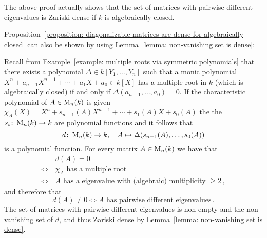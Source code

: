 \begin{remark}
  The above proof actually shows that the set of matrices with pairwise different eigenvalues is Zariski dense if $k$ is algebraically closed.
\end{remark}


\begin{remark}
  Proposition~\ref{proposition: diagonalizable matrices are dense for algebraically closed} can also be shown by using Lemma~\ref{lemma: non-vanishing set is dense}:
  
  Recall from Example~\ref{example: multiple roots via symmetric polynomials} that there exists a polynomial $\Delta \in k[Y_1, \dotsc, Y_n]$ such that a monic polynomial $X^n + a_{n-1} X^{n-1} + \dotsb + a_1 X + a_0 \in k[X]$ has a multiple root in $k$ (which is algebraically closed) if and only if $\Delta(a_{n-1}, \dotsc, a_0) = 0$.
  If the characteristic polynomial of $A \in \operatorname{M}_n(k)$ is given $\chi_A(X) = X^n + s_{n-1}(A) X^{n-1} + \dotsb + s_1(A) X + s_0(A)$ the the $s_i \colon \operatorname{M}_n(k) \to k$ are polynomial functions and it follows that
  \[
            d
    \colon  \operatorname{M}_n(k)
    \to     k,
    \quad   A
    \mapsto \Delta(s_{n-1}(A), \dotsc, s_0(A))
  \]
  is a polynomial function.
  For every matrix $A \in \operatorname{M}_n(k)$ we have that
  \begin{align*}
        &\, d(A) = 0  \\
    \iff&\, \text{$\chi_A$ has a multiple root} \\
    \iff&\, \text{$A$ has a eigenvalue with (algebraic) multiplicity $\geq 2$} \,,
  \end{align*}
  and therefore that
  \[
          d(A) \neq 0
    \iff  \text{$A$ has pairwise different eigenvalues} \,.
  \]
  The set of matrices with pairwise different eigenvalues is non-empty and the non-vanishing set of $d$, and thus Zariski dense by Lemma~\ref{lemma: non-vanishing set is dense}.
  

\end{remark}

